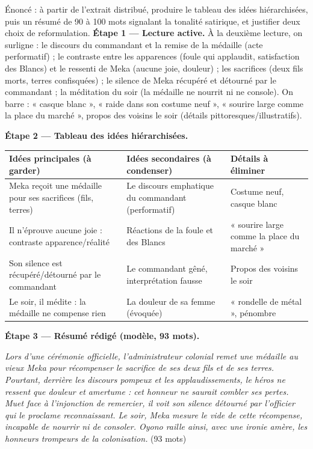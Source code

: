 \documentclass[11pt]{article}
\newcounter{popsec}
\newcounter{popsub}
\newcommand{\courssub}[1]{%
  \stepcounter{popsub}%
  \par\vspace{9pt}\noindent{\popxbold\fontsize{11.5}{13}\selectfont\color{popink}{\color{poporange}\thepopsec.\thepopsub}\hspace{6pt}#1}\par\nopagebreak\vspace{4pt}
}
\begin{document}
\courssub{Démarche et corrigé commenté}

\begin{exoresolu}
Énoncé : à partir de l'extrait distribué, produire le tableau des idées hiérarchisées, puis un résumé de 90 à 100 mots signalant la tonalité satirique, et justifier deux choix de reformulation.
\tcblower
\textbf{Étape 1 — Lecture active.} À la deuxième lecture, on surligne : le discours du commandant et la remise de la médaille (acte performatif) ; le contraste entre les apparences (foule qui applaudit, satisfaction des Blancs) et le ressenti de Meka (aucune joie, douleur) ; les sacrifices (deux fils morts, terres confisquées) ; le silence de Meka récupéré et détourné par le commandant ; la méditation du soir (la médaille ne nourrit ni ne console). On barre : « casque blanc », « raide dans son costume neuf », « sourire large comme la place du marché », propos des voisins le soir (détails pittoresques/illustratifs).

\textbf{Étape 2 — Tableau des idées hiérarchisées.}
\begin{center}
\begin{tabularx}{\linewidth}{|X|X|X|}
\hline
\rowcolor{popblueL} \textbf{Idées principales (à garder)} & \textbf{Idées secondaires (à condenser)} & \textbf{Détails à éliminer} \\
\hline
Meka reçoit une médaille pour ses sacrifices (fils, terres) & Le discours emphatique du commandant (performatif) & Costume neuf, casque blanc \\
\hline
Il n'éprouve aucune joie : contraste apparence/réalité & Réactions de la foule et des Blancs & « sourire large comme la place du marché » \\
\hline
Son silence est récupéré/détourné par le commandant & Le commandant gêné, interprétation fausse & Propos des voisins le soir \\
\hline
Le soir, il médite : la médaille ne compense rien & La douleur de sa femme (évoquée) & « rondelle de métal », pénombre \\
\hline
\end{tabularx}
\end{center}

\textbf{Étape 3 — Résumé rédigé (modèle, 93 mots).}

\emph{Lors d'une cérémonie officielle, l'administrateur colonial remet une médaille au vieux Meka pour récompenser le sacrifice de ses deux fils et de ses terres. Pourtant, derrière les discours pompeux et les applaudissements, le héros ne ressent que douleur et amertume : cet honneur ne saurait combler ses pertes. Muet face à l'injonction de remercier, il voit son silence détourné par l'officier qui le proclame reconnaissant. Le soir, Meka mesure le vide de cette récompense, incapable de nourrir ni de consoler. Oyono raille ainsi, avec une ironie amère, les honneurs trompeurs de la colonisation.} (93 mots)


\end{exoresolu}
\end{document}
